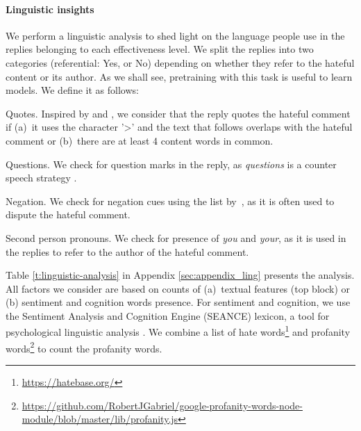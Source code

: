\documentclass[11pt]{article}
\begin{document}
\paragraph{Linguistic insights} 
We perform a linguistic analysis to shed light on the language people use in the replies belonging to each effectiveness level.
We split the replies into two categories (referential: Yes, or No) depending on whether they refer to the hateful content or its author.
As we shall see, pretraining with this task is useful to learn models.
We define it as follows:
\begin{compactitem}
	\item Quotes. Inspired by \citet{chakrabarty-etal-2019-ampersand} and \citet{jo-etal-2020-detecting},
	we consider that the reply quotes the hateful comment if
	(a)~it uses the character '>' and the text that follows overlaps with the hateful comment
	or
	(b)~there are at least 4 content words in common.
	
	
	\item Questions. We check for question marks in the reply, as \emph{questions} is a counter speech strategy \cite{chung-etal-2021-multilingual}.
	
	\item Negation. We check for negation cues using the list by~\citet{fancellu-etal-2016-neural},
	as it is often used to dispute the hateful comment.
	
	\item Second person pronouns. We check for presence of \emph{you} and \emph{your}, as it is used in the replies to refer to the author of the hateful comment.
\end{compactitem}

Table \ref{t:linguistic-analysis} in Appendix \ref{sec:appendix_ling} presents the analysis.
All factors we consider are based on counts of
(a)~textual features (top block)
or
(b) sentiment and cognition words presence.
For sentiment and cognition, we use the Sentiment Analysis and Cognition Engine (SEANCE) lexicon,
a tool for psychological linguistic analysis \cite{crossley2017sentiment}. 
We combine a list of hate words\footnote{\url{https://hatebase.org/}} and profanity words\footnote{\url{https://github.com/RobertJGabriel/google-profanity-words-node-module/blob/master/lib/profanity.js}} to count the profanity words.
\end{document}
